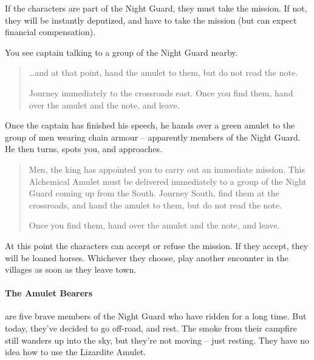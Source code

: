 \begin{multicols}{2}
If the characters are part of the Night Guard, they must take the mission.
If not, they will be instantly deputized, and have to take the mission (but can expect financial compensation).

\begin{boxtext}

	You see \gls{captain} talking to a group of the Night Guard nearby.

	\begin{quotation}

		\ldots and at that point, hand the amulet to them, but do not read the note.

		Journey immediately to the crossroads east.
		Once you find them, hand over the amulet and the note, and leave.

	\end{quotation}

	Once the captain has finished his speech, he hands over a green amulet to the group of men wearing chain armour -- apparently members of the Night Guard.
	He then turns, spots you, and approaches.

	\begin{quotation}

		Men, the king has appointed you to carry out an immediate mission.
		This Alchemical Amulet must be delivered immediately to a group of the Night Guard coming up from the South.
		Journey South, find them at the crossroads, and hand the amulet to them, but do not read the note.

		Once you find them, hand over the amulet and the note, and leave.

	\end{quotation}

\end{boxtext}

At this point the characters can accept or refuse the mission.  If they accept, they will be loaned horses.  Whichever they choose, play another encounter in the villages as soon as they leave town.

\paragraph{The Amulet Bearers} are five brave members of the Night Guard who have ridden for a long time.  But today, they've decided to go off-road, and rest.  The smoke from their campfire still wanders up into the sky, but they're not moving -- just resting.
They have no idea how to use the Lizardite Amulet.


\end{multicols}
